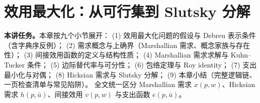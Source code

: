

\chapter{效用最大化：从可行集到 Slutsky 分解}
\noindent\textbf{本讲任务。}本章按九个小节展开：
(1) 效用最大化问题的假设与 Debreu 表示条件（含字典序反例）；
(2) 需求概念与上确界（Marshallian 需求、概念家族与存在性）；
(3) 间接效用函数的定义与结构性质；
(4) Marshallian 需求求解与 Kuhn--Tucker 条件；
(5) 边际替代率与可分性；
(6) 包络定理与 Roy identity；
(7) 支出最小化与对偶；
(8) Hicksian 需求与 Slutsky 分解；
(9) 本章小结（完整逻辑链、一页检查清单与常见陷阱）。
全文统一区分 Marshallian 需求 $x(p,w)$、Hicksian 需求 $h(p,\bar u)$、间接效用 $v(p,w)$ 与支出函数 $e(p,\bar u)$。
\tableofcontents
\clearpage












